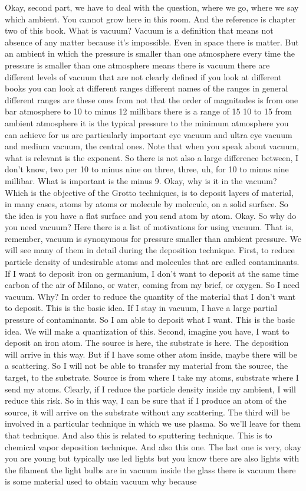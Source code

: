 Okay, second part, we have to deal with the question, where we go, where we say which ambient. You cannot grow here in this room. And the reference is chapter two of this book. What is vacuum? Vacuum is a definition that means not absence of any matter because it's impossible. Even in space there is matter. But an ambient in which the pressure is smaller than one atmosphere every time the pressure is smaller than one atmosphere means there is vacuum there are different levels of vacuum that are not clearly defined if you look at different books you can look at different ranges different names of the ranges in general different ranges are these ones from not that the order of magnitudes is from one bar atmosphere to 10 to minus 12 millibars there is a range of 15 10 to 15 from ambient atmosphere it is the typical pressure to the minimum atmosphere you can achieve for us are particularly important eye vacuum and ultra eye vacuum and medium vacuum, the central ones. Note that when you speak about vacuum, what is relevant is the exponent. So there is not also a large difference between, I don't know, two per 10 to minus nine on three, three, uh, for 10 to minus nine millibar. What is important is the minus 9. Okay, why is it in the vacuum? Which is the objective of the Grotto techniques, is to deposit layers of material, in many cases, atoms by atoms or molecule by molecule, on a solid surface. So the idea is you have a flat surface and you send atom by atom. Okay. So why do you need vacuum? Here there is a list of motivations for using vacuum. That is, remember, vacuum is synonymous for pressure smaller than ambient pressure. We will see many of them in detail during the deposition technique. First, to reduce particle density of undesirable atoms and molecules that are called contaminants. If I want to deposit iron on germanium, I don't want to deposit at the same time carbon of the air of Milano, or water, coming from my brief, or oxygen. So I need vacuum. Why? In order to reduce the quantity of the material that I don't want to deposit. This is the basic idea. If I stay in vacuum, I have a large partial pressure of contaminants. So I am able to deposit what I want. This is the basic idea. We will make a quantization of this. Second, imagine you have, I want to deposit an iron atom. The source is here, the substrate is here. The deposition will arrive in this way. But if I have some other atom inside, maybe there will be a scattering. So I will not be able to transfer my material from the source, the target, to the substrate. Source is from where I take my atoms, substrate where I send my atoms. Clearly, if I reduce the particle density inside my ambient, I will reduce this risk. So in this way, I can be sure that if I produce an atom of the source, it will arrive on the substrate without any scattering. The third will be involved in a particular technique in which we use plasma. So we'll leave for them that technique. And also this is related to sputtering technique. This is to chemical vapor deposition technique. And also this one. The last one is very, okay you are young but typically use led lights but you know there are also lights with the filament the light bulbs are in vacuum inside the glass there is vacuum there is some material used to obtain vacuum why because 
